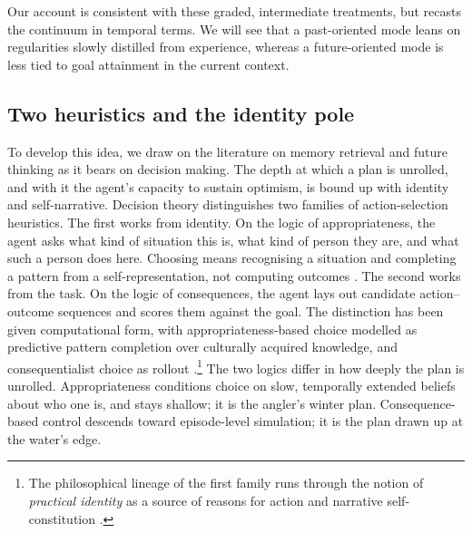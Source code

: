 \documentclass[11pt,a4paper]{article}
\begin{document}
Our account is consistent with these graded, intermediate treatments, but recasts the continuum in temporal terms. We will see that a past-oriented mode leans on regularities slowly distilled from experience, whereas a future-oriented mode is less tied to goal attainment in the current context.

\subsection{Two heuristics and the identity pole}\label{sec:two_faces}
To develop this idea, we draw on the literature on memory retrieval and future thinking as it bears on decision making. The depth at which a plan is unrolled, and with it the agent's capacity to sustain optimism, is bound up with identity and self-narrative. Decision theory distinguishes two families of action-selection heuristics. The first works from identity. On the logic of appropriateness, the agent asks what kind of situation this is, what kind of person they are, and what such a person does here. Choosing means recognising a situation and completing a pattern from a self-representation, not computing outcomes \citep{marcholsen1989, march1994, weberetal2004}. The second works from the task. On the logic of consequences, the agent lays out candidate action--outcome sequences and scores them against the goal. The distinction has been given computational form, with appropriateness-based choice modelled as predictive pattern completion over culturally acquired knowledge, and consequentialist choice as rollout \citep{leiboetal2024}.\footnote{The philosophical lineage of the first family runs through the notion of \emph{practical identity} as a source of reasons for action \citep{korsgaard1996} and narrative self-constitution \citep{schechtman1996}.} The two logics differ in how deeply the plan is unrolled. Appropriateness conditions choice on slow, temporally extended beliefs about who one is, and stays shallow; it is the angler's winter plan. Consequence-based control descends toward episode-level simulation; it is the plan drawn up at the water's edge.
\end{document}
